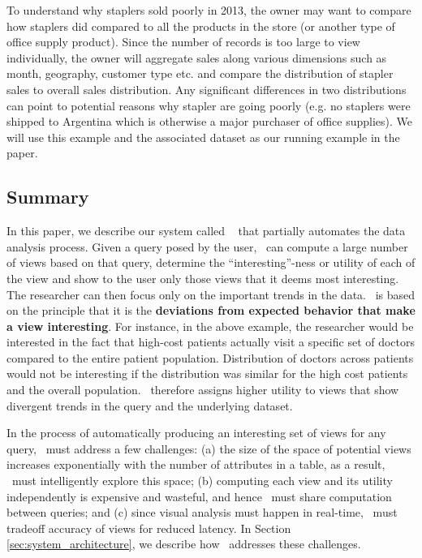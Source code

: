 To understand why staplers sold poorly in 2013, the owner may want to compare
how staplers did compared to all the products in the store (or another type of
office supply product). Since the number of records is too large to view
individually, the owner will aggregate sales along various dimensions such as
month, geography, customer type etc. and compare the distribution of stapler
sales to overall sales distribution. Any significant differences in two
distributions can point to potential reasons why stapler are going poorly (e.g.
no staplers were shipped to Argentina which is otherwise a major purchaser of
office supplies). We will use this example and the associated dataset as
our running example in the paper.


\subsection{Summary}
In this paper, we describe our system called \SeeDB\
\cite{DBLP:conf/vldb/Parameswaran2013} that partially automates the data
analysis process. Given a query posed by the user, \SeeDB\ can compute a large
number of views based on that query, determine the ``interesting''-ness or
utility of each of the view and show to the user only those views that it deems
most interesting. The researcher can then focus only on the important trends in
the data. \SeeDB\ is based on the principle that it is the {\bf deviations from
expected behavior that make a view interesting}. For instance, in the above
example, the researcher would be interested in the fact that high-cost patients
actually visit a specific set of doctors compared to the entire patient
population. Distribution of doctors across patients would not be interesting if
the distribution was similar for the high cost patients and the overall
population. \SeeDB\ therefore assigns higher utility to views that show
divergent trends in the query and the underlying dataset.

In the process of automatically producing an interesting set of views for any
query, \SeeDB\ must address a few challenges: (a) the size of
the space of potential views increases exponentially with the number of
attributes in a table, as a result, \SeeDB\ must intelligently explore this
space; (b) computing each view and its utility independently is expensive and
wasteful, and hence \SeeDB\ must share computation between queries; and (c)
since visual analysis must happen in real-time, \SeeDB\ must tradeoff accuracy
of views for reduced latency. In Section \ref{sec:system_architecture}, we
describe how \SeeDB\ addresses these challenges.
 
